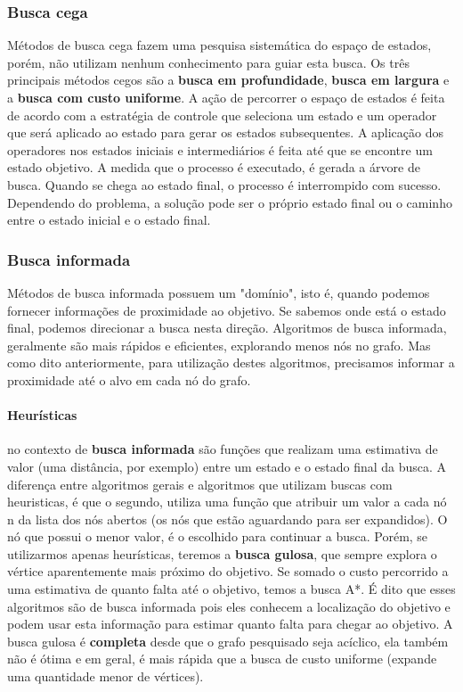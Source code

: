 \documentclass[12pt]{article}
\begin{document}
\subsubsection{Busca cega}
Métodos de busca cega fazem uma pesquisa sistemática do espaço de estados, porém, não utilizam nenhum conhecimento para guiar esta busca. Os três principais métodos cegos são a \textbf{busca em profundidade}, \textbf{busca em largura} e a \textbf{busca com custo uniforme}. 
A ação de percorrer o espaço de estados é feita de acordo com a estratégia de controle que seleciona um estado e um operador que será aplicado ao estado para gerar os estados subsequentes. A aplicação dos operadores nos estados iniciais e intermediários é feita até que se encontre um estado objetivo. A medida que o processo é executado, é gerada a árvore de busca. Quando se chega ao estado final, o processo é interrompido com sucesso. Dependendo do problema, a solução pode ser o próprio estado final ou o caminho entre o estado inicial e o estado final.  

\subsubsection{Busca informada}
Métodos de busca informada possuem um "domínio", isto é, quando podemos fornecer informações de proximidade ao objetivo. Se sabemos onde está o estado final, podemos direcionar a busca nesta direção.
Algoritmos de busca informada, geralmente são mais rápidos e eficientes, explorando menos nós no grafo. Mas como dito anteriormente, para utilização destes algoritmos, precisamos informar a proximidade até o alvo em cada nó do grafo.

\paragraph{Heurísticas} no contexto de \textbf{busca informada} são funções que realizam uma estimativa de valor (uma distância, por exemplo) entre um estado e o estado final da busca. A diferença entre algoritmos gerais e algoritmos que utilizam buscas com heuristicas, é que o segundo, utiliza uma função que atribuir um valor a cada nó n da lista dos nós abertos (os nós que estão aguardando para ser expandidos). O nó que possui o menor valor, é o escolhido para continuar a busca.
Porém, se utilizarmos apenas heurísticas, teremos a \textbf{busca gulosa}, que sempre explora o vértice aparentemente mais próximo do objetivo.
Se somado o custo percorrido a uma estimativa de quanto falta até o objetivo, temos a busca A*.
É dito que esses algoritmos são de busca informada pois eles conhecem a localização do objetivo e podem usar esta informação para estimar quanto falta para chegar ao objetivo.
A busca gulosa é \textbf{completa} desde que o grafo pesquisado seja acíclico, ela também não é ótima e em geral, é mais rápida que a busca de custo uniforme (expande uma quantidade menor de vértices).
\end{document}
